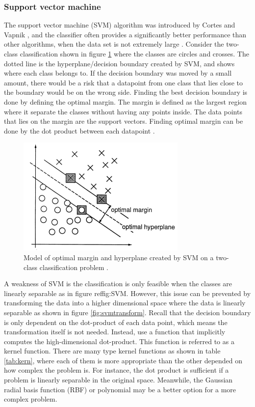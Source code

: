 \documentclass[USenglish]{ifimaster}  %
\begin{document}
\subsubsection{Support vector machine}
The support vector machine (SVM) algorithm was introduced by Cortes and Vapnik \cite{Cortes1995}, and the classifier often provides a significantly better performance than other algorithms, when the data set is not extremely large \cite{Marsland:2009:MLA:1571643}. Consider the two-class classification shown in figure \ref{fig:SVM} where the classes are circles and crosses. The dotted line is the hyperplane/decision boundary created by SVM, and shows where each class belongs to. If the decision boundary was moved by a small amount, there would be a risk that a datapoint from one class that lies close to the boundary would be on the wrong side. Finding the best decision boundary is done by defining the optimal margin. The margin is defined as the largest region where it separate the classes without having any points inside. The data points that lies on the margin are the support vectors. Finding optimal margin can be done by the dot product between each datapoint \cite{Cortes1995}.



\begin{figure}[h]
	\centering
	\includegraphics{Figures/SVM.PNG}
	\caption[An example of SVM classification]{Model of optimal margin and hyperplane created by SVM on a two-class classification problem \cite{Cortes1995}.}
	\label{fig:SVM}
\end{figure}
\FloatBarrier

A weakness of SVM is the classification is only feasible when the classes are linearly separable as in figure ref{fig:SVM}. However, this issue can be prevented by transforming the data into a higher dimensional space where the data is linearly separable as shown in figure \ref{fig:svmtransform}. Recall that the decision boundary is only dependent on the dot-product of each data point, which means the transformation itself is not needed. Instead, use a function that implicitly computes the high-dimensional dot-product. This function is referred to as a kernel function. There are many type kernel functions as shown in table \ref{tab:kern}, where each of them is more appropriate than the other depended on how complex the problem is. For instance, the dot product is sufficient if a problem is linearly separable in the original space. Meanwhile,  the Gaussian radial basis function (RBF) or polynomial may be a better option for a more complex problem.
\end{document}
